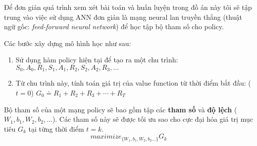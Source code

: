 Để đơn giản quá trình xem xét bài toán và huấn luyện trong đồ án này tôi sẽ tập trung vào việc sử dụng ANN đơn giản là mạng neural lan truyền thẳng (thuật ngữ gốc: \emph{feed-forward neural network}) để học tập bộ tham số cho policy. 

Các bước xây dựng mô hình học như sau:
\begin{enumerate}
    \item Sử dụng hàm policy hiện tại để tạo ra một chu trình: $S_{0}, A_{0}, R_{1}, S_{1}, A_{1}, R_{2}, S_{2}, A_{2}, R_{3}, \dots$
    \item Từ chu trình này, tính toán giá trị của value function từ thời điểm bắt đầu: ($t=0$) $ G_{0} \doteq R_{1}+R_{2}+R_{3}+\cdots+R_{T}$
\end{enumerate}

Bộ tham số của một mạng policy sẽ bao gồm tập các \textbf{tham số} và \textbf{độ lệch} ($W_1, b_1, W_2, b_2, ...$). Các tham số này sẽ được tối ưu sao cho cực đại hóa giá trị mục tiêu $G_k$ tại từng thời điểm $t=k$.
\begin{equation}
    maximize_{\{W_1, b_1, W_2, b_2...\}} G_k
\end{equation}

% 